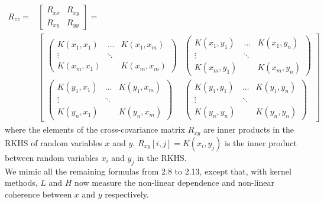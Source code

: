 \documentclass[12pt]{report} %
\begin{document}
\begin{equation}
\begin{split}
R_{zz}={} & \begin{bmatrix}
R_{xx} & R_{xy} \\
R_{xy} & R_{yy}
\end{bmatrix}= \\
& \begin{bmatrix}
\begin{pmatrix}
K(x_{1},x_{1}) & \dots & K(x_{1},x_{m})\\ \vdots & \ddots & \\ K(x_{m},x_{1}) & & K(x_{m},x_{m})
\end{pmatrix} &
\begin{pmatrix}
K(x_{1},y_{1}) & \dots & K(x_{1},y_{n})\\ \vdots & \ddots & \\ K(x_{m},y_{1}) & & K(x_{m},y_{n})
\end{pmatrix} \\
\begin{pmatrix}
K(y_{1},x_{1}) & \dots & K(y_{1},x_{m})\\ \vdots & \ddots & \\ K(y_{n},x_{1}) & & K(y_{n},x_{m})
\end{pmatrix} &
\begin{pmatrix}
K(y_{1},y_{1}) & \dots & K(y_{1},y_{n})\\ \vdots & \ddots & \\ K(y_{n},y_{n}) & & K(y_{n},y_{n})
\end{pmatrix}
\end{bmatrix}
\end{split}
\end{equation}
where the elements of the cross-covariance matrix $R_{xy}$ are inner products in the RKHS of random variables $x$ and $y$. $R_{xy}[i,j]=K(x_{i},y_{j})$ is the inner product between random variables $x_{i}$ and $y_{j}$ in the RKHS. \\
We mimic all the remaining formulas from 2.8 to 2.13, except that, with kernel methods, $L$ and $H$ now measure the non-linear dependence and non-linear coherence between $x$ and $y$ respectively.
\end{document}
